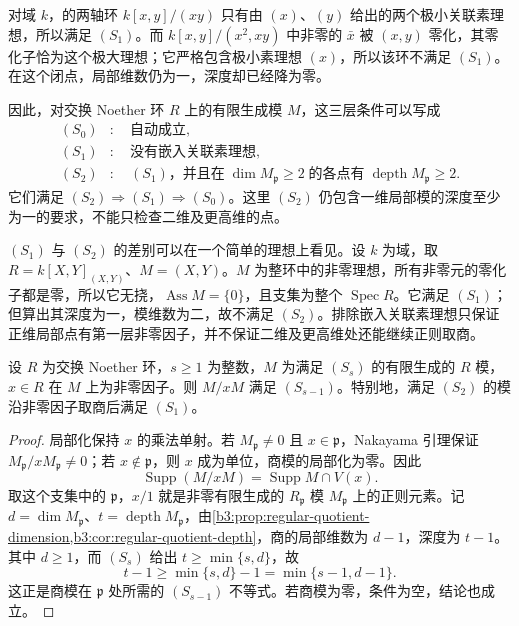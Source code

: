 对域 \(k\)，的两轴环 \(k[x,y]/(xy)\) 只有由 \((x)\)、\((y)\) 给出的两个极小关联素理想，所以满足 \((S_1)\)。而 \(k[x,y]/(x^2,xy)\) 中非零的 \(\bar x\) 被 \((x,y)\) 零化，其零化子恰为这个极大理想；它严格包含极小素理想 \((x)\)，所以该环不满足 \((S_1)\)。在这个闭点，局部维数仍为一，深度却已经降为零。

因此，对交换 Noether 环 \(R\) 上的有限生成模 \(M\)，这三层条件可以写成
\[
	\begin{aligned}
		(S_0)&:\quad\text{自动成立},\\
		(S_1)&:\quad\text{没有嵌入关联素理想},\\
		(S_2)&:\quad(S_1)\text{，并且在}\;\dim M_{\mathfrak p}\ge2 \;\text{的各点有}\;\operatorname{depth}M_{\mathfrak p}\ge2.
	\end{aligned}
\]
它们满足 \((S_2)\Rightarrow(S_1)\Rightarrow(S_0)\)。这里 \((S_2)\) 仍包含一维局部模的深度至少为一的要求，不能只检查二维及更高维的点。

\ProseParagraphBreak

\((S_1)\) 与 \((S_2)\) 的差别可以在一个简单的理想上看见。设 \(k\) 为域，取 \(R=k[X,Y]_{(X,Y)}\)、\(M=(X,Y)\)。\(M\) 为整环中的非零理想，所有非零元的零化子都是零，所以它无挠，\(\operatorname{Ass}M=\{0\}\)，且支集为整个 \(\operatorname{Spec}R\)。它满足 \((S_1)\)；但算出其深度为一，模维数为二，故不满足 \((S_2)\)。排除嵌入关联素理想只保证正维局部点有第一层非零因子，并不保证二维及更高维处还能继续正则取商。

\begin{proposition}\label{b3:prop:s2-regular-section-s1}
	设 \(R\) 为交换 Noether 环，\(s\ge1\) 为整数，\(M\) 为满足 \((S_s)\) 的有限生成的 \(R\) 模，\(x\in R\) 在 \(M\) 上为非零因子。则 \(M/xM\) 满足 \((S_{s-1})\)。特别地，满足 \((S_2)\) 的模沿非零因子取商后满足 \((S_1)\)。
\end{proposition}
\begin{proof}
	局部化保持 \(x\) 的乘法单射。若 \(M_{\mathfrak p}\ne0\) 且 \(x\in\mathfrak p\)，Nakayama 引理保证 \(M_{\mathfrak p}/xM_{\mathfrak p}\ne0\)；若 \(x\notin\mathfrak p\)，则 \(x\) 成为单位，商模的局部化为零。因此
	\[
		\operatorname{Supp}(M/xM)=\operatorname{Supp}M\cap V(x).
	\]
	取这个支集中的 \(\mathfrak p\)，\(x/1\) 就是非零有限生成的 \(R_{\mathfrak p}\) 模 \(M_{\mathfrak p}\) 上的正则元素。记 \(d=\dim M_{\mathfrak p}\)、\(t=\operatorname{depth}M_{\mathfrak p}\)，由\cref{b3:prop:regular-quotient-dimension,b3:cor:regular-quotient-depth}，商的局部维数为 \(d-1\)，深度为 \(t-1\)。其中 \(d\ge1\)，而 \((S_s)\) 给出 \(t\ge\min\{s,d\}\)，故
	\[
		t-1\ge\min\{s,d\}-1=\min\{s-1,d-1\}.
	\]
	这正是商模在 \(\mathfrak p\) 处所需的 \((S_{s-1})\) 不等式。若商模为零，条件为空，结论也成立。
\end{proof}

